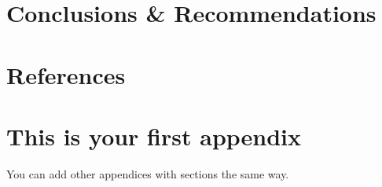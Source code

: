\documentclass[a4paper, 12pt, american]{article}
\begin{document}
\lipsum[1]

\newpage

\section{Conclusions \& Recommendations}

\lipsum[1]

\newpage

\section*{References}

\printbibliography[heading=none]

\newpage

\appendices

\section{This is your first appendix}

You can add other appendices with sections the same way.

\lipsum[4]
\end{document}
